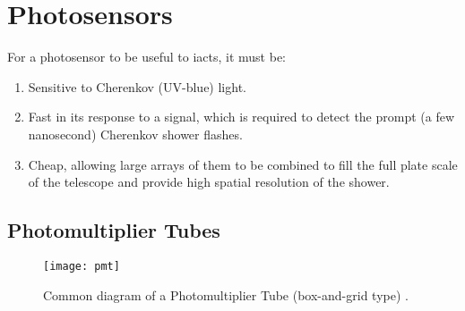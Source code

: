 \section{Photosensors}

For a photosensor to be useful to \glspl{iact}, it must be:
\begin{enumerate}
\item Sensitive to Cherenkov (UV-blue) light.
\item Fast in its response to a signal, which is required to detect the prompt (a few nanosecond) Cherenkov shower flashes.
\item Cheap, allowing large arrays of them to be combined to fill the full plate scale of the telescope and provide high spatial resolution of the shower.
\end{enumerate}

\subsection{Photomultiplier Tubes}

\begin{figure}
	\centering
    \texttt{[image: pmt]} 
	\caption[Diagram of a Photomultiplier Tube.]{Common diagram of a Photomultiplier Tube (box-and-grid type) \cite{Hamamatsu2016}.}
	\label{fig:pmt}
\end{figure}

